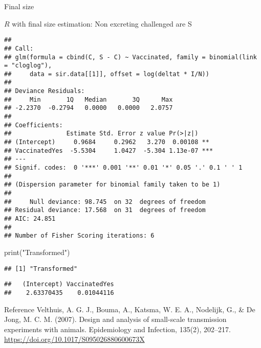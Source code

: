 \documentclass[
  ignorenonframetext,
]{beamer}
\newenvironment{Shaded}{\begin{snugshade}}{\end{snugshade}}
\newcommand{\FunctionTok}[1]{\textcolor[rgb]{0.00,0.00,0.00}{#1}}
\newcommand{\NormalTok}[1]{#1}
\newcommand{\SpecialCharTok}[1]{\textcolor[rgb]{0.00,0.00,0.00}{#1}}
\newcommand{\StringTok}[1]{\textcolor[rgb]{0.31,0.60,0.02}{#1}}
\begin{document}
\begin{frame}[fragile]{Final size}
\begin{block}{\(R\) with final size estimation: Non excreting challenged
are S}
\begin{verbatim}
## 
## Call:
## glm(formula = cbind(C, S - C) ~ Vaccinated, family = binomial(link = "cloglog"), 
##     data = sir.data[[1]], offset = log(deltat * I/N))
## 
## Deviance Residuals: 
##     Min       1Q   Median       3Q      Max  
## -2.2370  -0.2794   0.0000   0.0000   2.0757  
## 
## Coefficients:
##               Estimate Std. Error z value Pr(>|z|)    
## (Intercept)     0.9684     0.2962   3.270  0.00108 ** 
## VaccinatedYes  -5.5304     1.0427  -5.304 1.13e-07 ***
## ---
## Signif. codes:  0 '***' 0.001 '**' 0.01 '*' 0.05 '.' 0.1 ' ' 1
## 
## (Dispersion parameter for binomial family taken to be 1)
## 
##     Null deviance: 98.745  on 32  degrees of freedom
## Residual deviance: 17.568  on 31  degrees of freedom
## AIC: 24.851
## 
## Number of Fisher Scoring iterations: 6
\end{verbatim}

\begin{Shaded}
\begin{Highlighting}[]
\FunctionTok{print}\NormalTok{(}\StringTok{"Transformed"}\NormalTok{)}
\end{Highlighting}
\end{Shaded}

\begin{verbatim}
## [1] "Transformed"
\end{verbatim}

\begin{Shaded}
\end{Shaded}

\begin{verbatim}
##   (Intercept) VaccinatedYes 
##    2.63370435    0.01044116
\end{verbatim}
\end{block}
\end{frame}

\begin{frame}{Reference}
\protect\hypertarget{reference}{}
Velthuis, A. G. J., Bouma, A., Katsma, W. E. A., Nodelijk, G., \& De
Jong, M. C. M. (2007). Design and analysis of small-scale transmission
experiments with animals. Epidemiology and Infection, 135(2), 202--217.
\url{https://doi.org/10.1017/S095026880600673X}
\end{frame}
\end{document}
